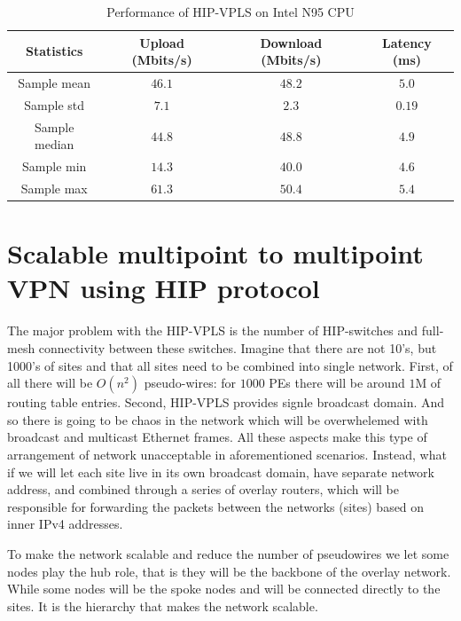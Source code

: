 \begin{table}
    \centering
    \begin{tabular}{|c|c|c|c|}
    \hline
    Statistics     & Upload (Mbits/s)        & Download (Mbits/s)     & Latency (ms) \\\hline
    Sample mean    & $46.1$                  & $48.2$                 & $5.0$         \\
    Sample std     & $7.1$                   & $2.3$                  & $0.19$        \\
    Sample median  & $44.8$                  & $48.8$                 & $4.9$         \\
    Sample min     & $14.3$                  & $40.0$                 & $4.6$         \\
    Sample max     & $61.3$                  & $50.4$                 & $5.4$         \\
    \hline
    \end{tabular}
    \caption{Performance of HIP-VPLS on Intel N95 CPU}  
    \label{tab:vpls-performance}
\end{table}

\section{Scalable multipoint to multipoint VPN using HIP protocol}

The major problem with the HIP-VPLS is the number of HIP-switches and
full-mesh connectivity between these switches. Imagine that there are 
not 10's, but 1000's of sites and that all sites need to be 
combined into single network. First, of all there will be 
$O(n^2)$ pseudo-wires: for $1000$ PEs there will be  
around $1$M of routing table entries. Second, HIP-VPLS provides 
signle broadcast domain. And so there is going to be 
chaos in the network which will be overwhelemed with broadcast
and multicast Ethernet frames. All these aspects make this type of
arrangement of network unacceptable in aforementioned scenarios.
Instead, what if we will let each site live in its own broadcast
domain, \ie have separate network address, and combined through 
a series of overlay routers, which will be responsible for 
forwarding the packets between the networks (sites) based on 
inner IPv4 addresses. 

To make the network scalable and reduce the number of pseudowires
we let some nodes play the hub role, that is they will be the backbone 
of the overlay network. While some nodes will be the spoke nodes
and will be connected directly to the sites. It is the hierarchy 
that makes the network scalable. 

